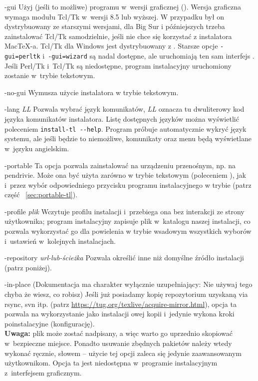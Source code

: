 \documentclass{article}
\let\textsl\textit
\begin{document}
\begin{ttdescription}
\item[-gui] Użyj (jeśli to możliwe) programu w~wersji graficznej (\GUI). Wersja graficzna wymaga
 modułu Tcl/Tk w~wersji 8.5 lub wyższej.   W przypadku \macOS  był on dystrybuowany ze starszymi wersjami, dla Big Sur i późniejszych trzeba zainstalować Tcl/Tk samodzielnie, jeśli nie chce się korzystać z instalatora  Mac\TeX-a. Tcl/Tk dla Windows jest
 dystrybuowany z \TL. Starsze opcje  \texttt{-gui=perltk} i~\texttt{-gui=wizard} są nadal dostępne,
 ale uruchomiają ten sam interfejs \GUI{}. Jeśli  Perl/Tk i~Tcl/Tk są niedostępne,
 program instalacyjny uruchomiony zostanie w~trybie tekstowym.

\item[-no-gui] Wymusza użycie instalatora w trybie tekstowym.

\item[-lang {\sl LL}] Pozwala wybrać język komunikatów,
 \textsl{LL} oznacza tu dwuliterowy kod języka komunikatów instalatora. Listę dostępnych
 języków można wyświetlić poleceniem  \verb|install-tl --help|.
 Program próbuje automatycznie wykryć język systemu, ale jeśli będzie to niemożliwe,
 komunikaty oraz menu będą wyświetlane w~języku angielskim.

\item[-portable] Ta opcja pozwala zainstalować \TL{} na urządzeniu przenośnym, np. na pendrivie.
 Może ona być użyta zarówno w trybie tekstowym (poleceniem ),
 jak i~przez wybór odpowiedniego przycisku programu instalacyjnego w trybie
 \GUI{} (patrz część ~\ref{sec:portable-tl}).

\item[-profile {\sl plik}] Wczytuje  profilu instalacji
 i~przebiega ona bez interakcji ze strony użytkownika; program
 instalacyjny zapisuje plik  w~katalogu
  naszej instalacji, co pozwala wykorzystać go dla
 powielenia w trybie wsadowym wszystkich wyborów i~ustawień w~kolejnych
 instalacjach.

\item [-repository {\sl url-lub-ścieżka}] Pozwala określić inne niż
 domyślne źródło instalacji (patrz poniżej).

\item[-in-place](Dokumentacja ma charakter wyłącznie uzupełniający: Nie używaj tego
  chyba że wiesz, co robisz)
Jeśli już posiadamy kopię repozytorium \TL{} uzyskaną via
 rsync, svn itp. (patrz \url{https://tug.org/texlive/acquire-mirror.html}),
 opcja ta pozwala na wykorzystanie jako instalacji owej kopii i~jedynie
 wykona kroki poinstalacyjne (konfigurację). \\
 \textbf{Uwaga:} plik
  może zostać nadpisany, a więc warto go
 uprzednio skopiować w~bezpieczne miejsce. Ponadto usuwanie zbędnych pakietów
 należy wtedy wykonać  ręcznie, słowem -- użycie tej opcji zaleca się  jedynie
 zaawansowanym użytkownikom. Opcja ta jest niedostępna w~programie
 instalacyjnym z~interfejsem graficznym.
\end{ttdescription}
\end{document}
